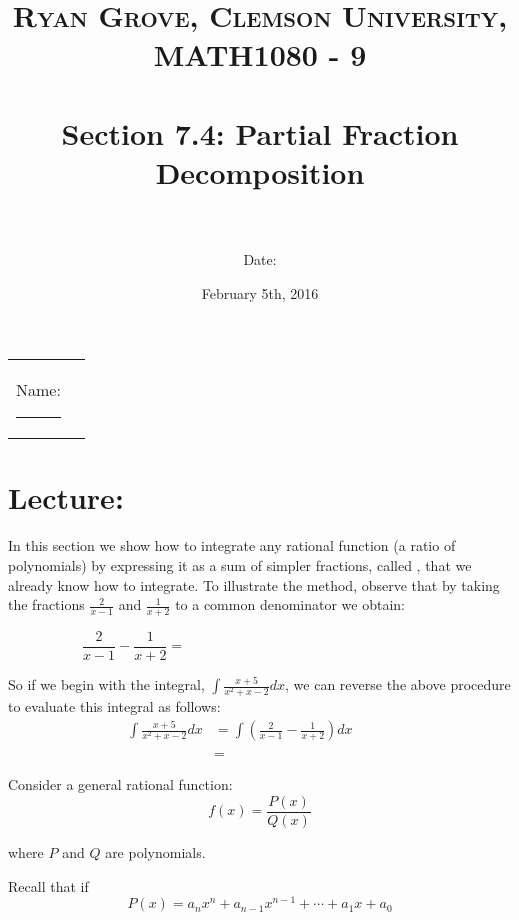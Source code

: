 \documentclass[paper=a4, fontsize=11pt]{scrartcl} %
\title{	
\normalfont \normalsize 
\textsc{Ryan Grove, Clemson University, MATH1080 - 9} \\ [25pt] %
\horrule{0.5pt} \\[0.4cm] %
\huge Section 7.4: Partial Fraction Decomposition \\ %
\horrule{2pt} \\[0.5cm] %
}
\author{Date:} %
\date{\normalsize February 5th, 2016} %
\numberwithin{equation}{section} %
\numberwithin{figure}{section} %
\numberwithin{table}{section} %
\newcommand{\ds}{\displaystyle}
\begin{document}
\maketitle %

\begin{flushleft}
\begin{tabular}{l l}
Name: \rule{3.2in}{.01cm}  & {}%
\end{tabular}
\end{flushleft}


\section*{\textbf{Lecture:}}

In this section we show how to integrate any rational function (a ratio of polynomials) by expressing it as a sum of simpler fractions, called \underline{\hspace{1.25in}} \underline{\hspace{1.25in}}, that we already know how to integrate. To illustrate the method, observe that by taking the fractions $\ds\frac{2}{x-1}$ and $\ds\frac{1}{x+2}$ to a common denominator we obtain:

\[\ds\frac{2}{x-1} - \ds\frac{1}{x+2} = \hspace{3in}\]

\indent

So if we begin with the integral, $\ds\int \ds\frac{x+5}{x^2+x-2}dx$, we can reverse the above procedure to evaluate this integral as follows:
\begin{align*}
\ds\int \ds\frac{x+5}{x^2 +x-2}dx &= \ds\int\left(\ds\frac{2}{x-1} - \ds\frac{1}{x+2}\right)dx\\
&\text{ }\\
&= \hspace{2in}
\end{align*}

Consider a general rational function:
\[f(x) = \ds\frac{P(x)}{Q(x)}\]

where $P$ and $Q$ are polynomials.\\
\indent

Recall that if 
\[P(x) = a_n x^n + a_{n-1}x^{n-1} + \cdots + a_1 x + a_0\]
\end{document}
